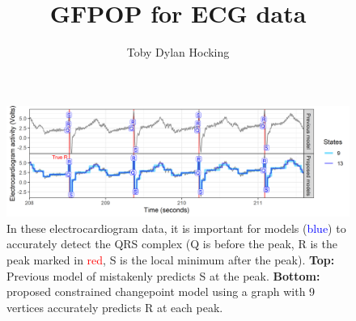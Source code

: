 \documentclass[12pt]{article}
\begin{document}
\title{GFPOP for ECG data}
\author{Toby Dylan Hocking}
\maketitle


\begin{figure}
  \includegraphics[width=\textwidth]{figure-two-ecg-graphs-data}

  
  \caption{\label{fig:ecg} In these electrocardiogram data, it is
    important for models (\textcolor{blue}{blue}) to accurately detect
    the QRS complex (Q is before the peak, R is the peak marked in
    \textcolor{red}{red}, S is the local minimum after the
    peak). \textbf{Top:} Previous model of \citet{PanTompkins1985}
    mistakenly predicts S at the peak. \textbf{Bottom:} proposed
    constrained changepoint model using a graph with 9 vertices
    accurately predicts R at each peak.}

\end{figure}



\end{document}
